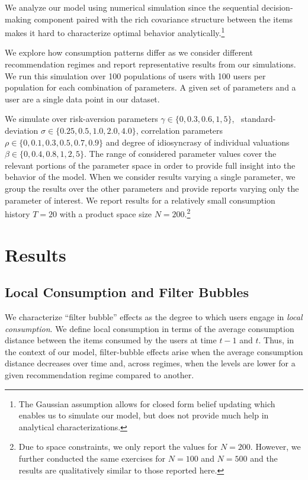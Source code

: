 \documentclass[sigconf]{acmart}
\newcommand{\xhdr}[1]{\vspace{1mm} \noindent{\bf #1}}
\begin{document}
\xhdr{Simulation Details.}
We analyze our model using numerical simulation since the sequential decision-making component paired with the rich covariance structure between the items makes it hard to characterize optimal behavior analytically.\footnote{The Gaussian assumption allows for closed form belief updating which enables us to simulate our model, but does not provide much help in analytical characterizations.}


We explore how consumption patterns differ as we consider different recommendation regimes and report representative results from our simulations. We run this simulation over 100 populations of users with 100 users per population for each combination of parameters. 
A given set of parameters and a user are a single data point in our dataset.



We simulate over risk-aversion parameters $\gamma \in \{ 0, 0.3, 0.6, 1, 5 \}$, \ standard-deviation $\sigma \in \{ 0.25, 0.5, 1.0, 2.0, 4.0 \}$, correlation parameters $\rho\in \{ 0, 0.1, 0.3, 0.5, 0.7, 0.9 \} $ and degree of idiosyncrasy of individual valuations $\beta \in \{ 0, 0.4, 0.8, 1, 2, 5\}$. The range of considered parameter values cover the relevant portions of the parameter space in order to provide full insight into the behavior of the model. When we consider results varying a single parameter, we group the results over the other parameters and provide reports varying only the parameter of interest. We report results for a relatively small consumption history $T=20$ with a product space size $N=200$.\footnote{Due to space constraints, we only report the values for $N = 200$. However, we further conducted the same exercises for $N = 100$ and $N = 500$ and the results are qualitatively similar to those reported here.}
\section{Results}
\subsection{Local Consumption and Filter Bubbles}
We characterize ``filter bubble'' effects as the degree to which users engage in \textit{local consumption}. We define local consumption in terms of the average consumption distance between the items consumed by the users at time $t-1$ and $t$. Thus, in the context of our model, filter-bubble effects arise when the average consumption distance decreases over time and, across regimes, when the levels are lower for a given recommendation regime compared to another.
\end{document}

